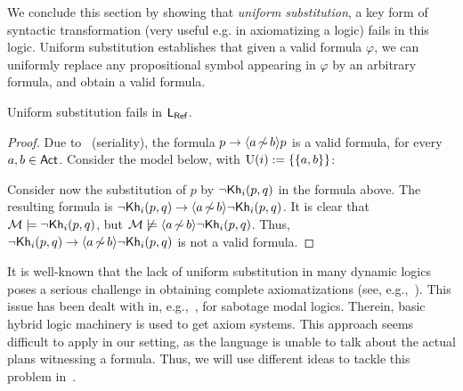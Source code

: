 We conclude this section by showing that \emph{uniform substitution}, a key form of syntactic transformation (very useful e.g. in axiomatizing a logic) fails in this logic. Uniform substitution establishes that given a valid formula $\varphi$, we can uniformly replace any propositional symbol appearing in $\varphi$ by an arbitrary formula, and obtain a valid formula.

\medskip

\begin{proposition}\label{prop:substitution-ref}
    Uniform substitution fails in $\mathsf{L_{Ref}}$.
\end{proposition}

\begin{proof}
Due to~ (seriality), the formula $p\to\langle a{\,\not\sim\,}b \rangle p$ is a valid formula, for every $a,b\in{\rm \sf Act}$. Consider the model below, with $\operatorname{U}(i):=\{ \{ a,b \} \}$:

\begin{center}
\end{center}
Consider now the substitution of $p$ by $\neg{\sf Kh}_i(p,q)$ in the formula above. The resulting formula is $\neg{\sf Kh}_i(p,q)\to\langle a{\,\not\sim\,}b \rangle\neg{\sf Kh}_i(p,q)$. It is clear that $\mathcal{M}\models\neg{\sf Kh}_i(p,q)$, but $\mathcal{M}\not\models\langle a{\,\not\sim\,}b \rangle\neg{\sf Kh}_i(p,q)$. Thus, $\neg{\sf Kh}_i(p,q)\to\langle a{\,\not\sim\,}b \rangle\neg{\sf Kh}_i(p,q)$ is not a valid formula.
\end{proof}

It is well-known that the lack of uniform substitution in many dynamic logics poses a serious challenge in obtaining complete axiomatizations (see, e.g.,~\cite{HoHoIc11}). This issue has been dealt with in, e.g.,~\cite{BenthemMZ2022,BenthemLSY22}, for sabotage modal logics. Therein, basic hybrid logic machinery is used to get axiom systems. This approach seems difficult to apply in our setting, as the language is unable to talk about the actual plans witnessing a formula. Thus, we will use different ideas to tackle this problem in~.

%

